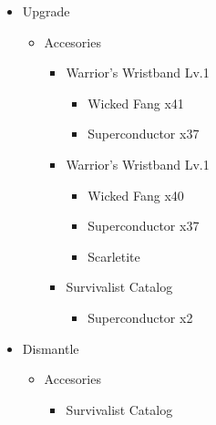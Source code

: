 \begin{upgrade}
	\begin{itemize}
		\item Upgrade
			\begin{itemize}
				\item Accesories
					\begin{itemize}
						\item Warrior's Wristband Lv.1
							\begin{itemize}
								\item Wicked Fang x41
								\item Superconductor x37
							\end{itemize}
						\item Warrior's Wristband Lv.1
							\begin{itemize}
								\item Wicked Fang x40
								\item Superconductor x37
								\item Scarletite
							\end{itemize}
						\item Survivalist Catalog
							\begin{itemize}
								\item Superconductor x2
							\end{itemize}
					\end{itemize}
			\end{itemize}
		\item Dismantle
			\begin{itemize}
				\item Accesories
					\begin{itemize}
						\item Survivalist Catalog
					\end{itemize}
			\end{itemize}		
	\end{itemize}
\end{upgrade}

